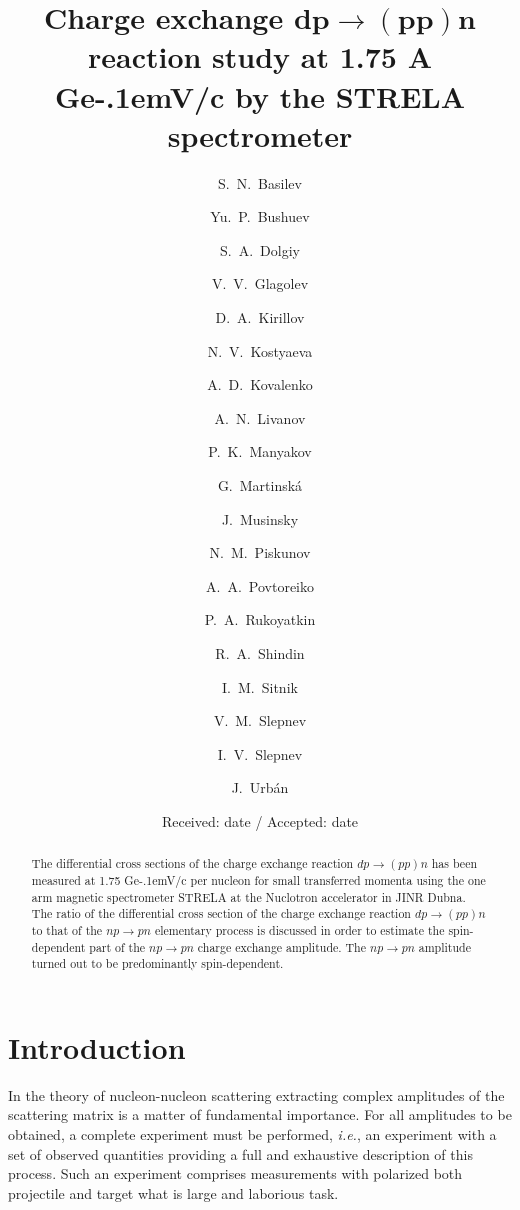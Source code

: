 \documentclass[twocolumn,epjc3]{svjour3}
\newcommand{\np}     {\ensuremath{np \rightarrow pn}\xspace}
\newcommand{\dpchex} {\ensuremath{dp \rightarrow (pp)n}\xspace}
\newcommand{\GeVc}   {Ge\kern-.1emV/c\xspace}
\begin{document}
\title{Charge exchange
  $\boldsymbol{{\dpchex}}$ %
  reaction study at 1.75 A \GeVc by the STRELA spectrometer}

\author{\raggedright
  S.~N.~Basilev    \and Yu.~P.~Bushuev   \and
  S.~A.~Dolgiy     \and V.~V.~Glagolev   \and
  D.~A.~Kirillov   \and N.~V.~Kostyaeva  \and
  A.~D.~Kovalenko  \and A.~N.~Livanov    \and
  P.~K.~Manyakov   \and G.~Martinsk\'{a} \and
  J.~Musinsky     \and N.~M.~Piskunov   \and
  A.~A.~Povtoreiko \and P.~A.~Rukoyatkin \and
  R.~A.~Shindin    \and I.~M.~Sitnik     \and
  V.~M.~Slepnev    \and I.~V.~Slepnev    \and
  J.~Urb\'{a}n
}


\date{Received: date / Accepted: date}
\maketitle

\begin{abstract}
  The differential cross sections of the charge exchange reaction \dpchex has
  been measured at 1.75 \GeVc per nucleon for small transferred momenta using
  the one arm magnetic spectrometer STRELA at the Nuclotron accelerator in JINR
  Dubna. The ratio of the differential cross section of the charge exchange
  reaction \dpchex to that of the \np elementary process is discussed in order
  to estimate the spin-dependent part of the \np charge exchange amplitude. The
  \np amplitude turned out to be predominantly spin-dependent.
\end{abstract}

\section{Introduction}
In the theory of nucleon-nucleon scattering extracting complex amplitudes of the
scattering matrix is a matter of fundamental importance. For all amplitudes to
be obtained, a complete experiment must be performed, \textit{i.e.}, an
experiment with a set of observed quantities providing a full and exhaustive
description of this process. Such an experiment comprises measurements with
polarized both projectile and target what is large and laborious task.
\end{document}

